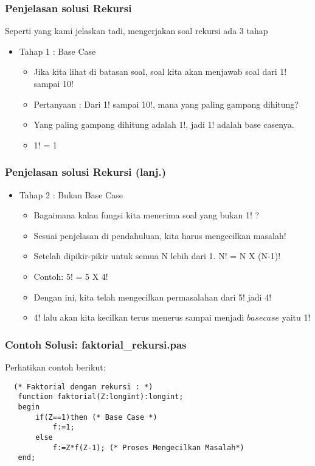 \documentclass{beamer}
\begin{document}
\begin{frame}
\frametitle{Penjelasan solusi Rekursi}
Seperti yang kami jelaskan tadi, mengerjakan soal rekursi ada 3 tahap
\begin{itemize}
    \item Tahap 1 : Base Case
    \begin {itemize}
        \item Jika kita lihat di batasan soal, soal kita akan menjawab soal dari 1! sampai 10!
        \item Pertanyaan : Dari 1! sampai 10!, mana yang paling gampang dihitung?
        \item Yang paling gampang dihitung adalah 1!, jadi 1! adalah base casenya.
        \item 1! = 1
    \end {itemize}
\end{itemize}
\end{frame} 
 
\begin{frame}
\frametitle{Penjelasan solusi Rekursi (lanj.) }
\begin{itemize}
    \item Tahap 2 : Bukan Base Case
    \begin {itemize}
        \item Bagaimana kalau fungsi kita menerima soal yang bukan 1! ?
        \item Sesuai penjelasan di pendahuluan, kita harus mengecilkan masalah!
        \item Setelah dipikir-pikir untuk semua N lebih dari 1. N! = N X (N-1)! 
        \item Contoh: 5! = 5 X 4!
        \item Dengan ini, kita telah mengecilkan permasalahan dari 5! jadi 4!
        \item 4! lalu akan kita kecilkan terus menerus sampai menjadi $base case$ yaitu 1!
    \end {itemize}
\end{itemize}
\end{frame} 

\begin{frame}[fragile]
\frametitle{Contoh Solusi: faktorial\_rekursi.pas}
Perhatikan contoh berikut:
\begin{lstlisting}
  (* Faktorial dengan rekursi : *)
   function faktorial(Z:longint):longint;
   begin
       if(Z==1)then (* Base Case *)
           f:=1;
       else
           f:=Z*f(Z-1); (* Proses Mengecilkan Masalah*)
   end;      
\end{lstlisting}
\end{frame}
 
\end{document}

